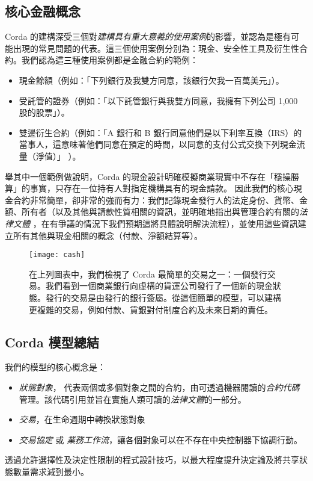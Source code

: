 \documentclass[UTF8]{ctexart}
\begin{document}
\subsection{核心金融概念}
Corda 的建構深受三個對\textit{建構具有重大意義的使用案例}的影響，並認為是極有可能出現的常見問題的代表。這三個使用案例分別為：現金、安全性工具及衍生性合約。我們認為這三種使用案例都是金融合約的範例：
\begin{itemize}
\item 現金餘額（例如：「下列銀行及我雙方同意，該銀行欠我一百萬美元」）。
\item 受託管的證券（例如：「以下託管銀行與我雙方同意，我擁有下列公司 1,000 股的股票」）。
\item 雙邊衍生合約（例如：「A 銀行和 B 銀行同意他們是以下利率互換（IRS）的當事人，這意味著他們同意在預定的時間，以同意的支付公式交換下列現金流量（淨值）」 ）。
\end{itemize}
舉其中一個範例做說明，Corda 的現金設計明確模擬商業現實中不存在「穩操勝算」的事實，只存在一位持有人對指定機構具有的現金請款。\cite{BOE} 因此我們的核心現金合約非常簡單，卻非常的強而有力：我們記錄現金發行人的法定身份、貨幣、金額、所有者（以及其他與請款性質相關的資訊，並明確地指出與管理合約有關的\textit{法律文體} ，在有爭議的情況下我們預期這將具體說明解決流程），並使用這些資訊建立所有其他與現金相關的概念（付款、淨額結算等）。
\begin{figure}[H]
\texttt{[image: cash]}
\caption{在上列圖表中，我們檢視了 Corda 最簡單的交易之一：一個發行交易。我們看到一個商業銀行向虛構的貨運公司發行了一個新的現金狀態。發行的交易是由發行的銀行簽屬。從這個簡單的模型，可以建構更複雜的交易，例如付款、貨銀對付制度合約及未來日期的責任。}
\end{figure}
\subsection{Corda 模型總結}
我們的模型的核心概念是：
\begin{itemize}
\item \textit{狀態對象}， 代表兩個或多個對象之間的合約，由可透過機器閱讀的\textit{合約代碼}管理。該代碼引用並旨在實施人類可讀的\textit{法律文體}的一部分。\item \textit{交易}，在生命週期中轉換狀態對象
\item \textit{交易協定} 或 \textit{業務工作流}，讓各個對象可以在不存在中央控制器下協調行動。
\end{itemize}

透過允許選擇性及決定性限制的程式設計技巧，以最大程度提升決定論及將共享狀態數量需求減到最小。
\end{document}
